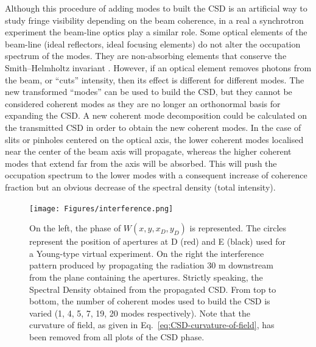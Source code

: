 \documentclass[%
 reprint,
 amsmath,amssymb,
 aps,
]{revtex4-1}
\begin{document}
Although this procedure of adding modes to built the CSD is an artificial way to study fringe visibility depending on the beam coherence, in a real a synchrotron experiment the beam-line optics play a similar role. Some optical elements of the beam-line (ideal reflectors, ideal focusing elements) do not alter the occupation spectrum of the modes. They are non-absorbing elements that conserve the Smith--Helmholtz invariant \cite{BornWolf}. However, if an optical element removes photons from the beam, or ``cuts'' intensity, then its effect is different for different modes. The new transformed ``modes'' can be used to build the CSD, but they cannot be considered coherent modes as they are no longer an orthonormal basis for expanding the CSD. A new coherent mode decomposition could be calculated on the transmitted CSD in order to obtain the new coherent modes. In the case of slits or pinholes centered on the optical axis, the lower coherent modes localised near the center of the beam axis will propagate, whereas the higher coherent modes that extend far from the axis will be absorbed. This will push the occupation spectrum to the lower modes with a consequent increase of coherence fraction but an obvious decrease of the spectral density (total intensity).     

\begin{figure}
\texttt{[image: Figures/interference.png]}
\caption{On the left, the phase of $W(x,y,x_{D},y_{D})$ is represented. The circles represent the position of apertures at D (red) and E (black) used for a Young-type virtual experiment. On the right the interference pattern produced by propagating the radiation 30 m downstream from the plane containing the apertures. Strictly speaking, the Spectral Density obtained from the propagated CSD. From top to bottom, the number of coherent modes used to build the CSD is varied (1, 4, 5, 7, 19, 20 modes respectively). Note that the curvature of field, as given in Eq.~\ref{eq:CSD-curvature-of-field}, has been removed from all plots of the CSD phase.}
%
%
%
%
%
%
\label{young}
\end{figure}
\end{document}
